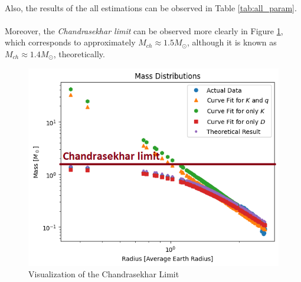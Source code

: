 \documentclass[letterpaper,12pt]{article}
\begin{document}
\paragraph{} Also, the results of the all estimations can be observed in Table \ref{tab:all_param}.

\begin{table}[H]
    \centering
    \caption{Overall Estimated Parameter Set}
    \label{tab:all_param}
    \end{table}

\paragraph{} Moreover, the \textit{Chandrasekhar limit} can be observed more clearly in Figure \ref{fig:chandrasekhar}, which corresponds to approximately $M_{ch} \approx 1.5 M_\odot$, although it is known as $M_{ch} \approx 1.4 M_\odot$, theoretically.

\begin{figure}[H] 
   \centering \includegraphics[width=0.6\columnwidth]{figures/7_n_ll_ms_r_chandrasekhar.png}           
                \caption{Visualization of the Chandrasekhar Limit}                
                   \label{fig:chandrasekhar}
   \end{figure}
\end{document}
